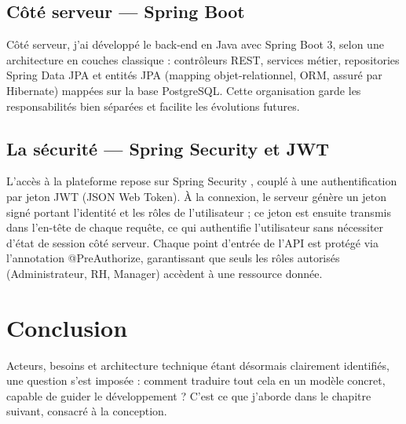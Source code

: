 \subsection{Côté serveur — Spring Boot}
\label{sec_2_3_3}
Côté serveur, j’ai développé le back-end en Java avec Spring Boot 3, selon une architecture en couches classique : contrôleurs REST, services métier, repositories Spring Data JPA et entités JPA (mapping objet-relationnel, ORM, assuré par Hibernate) mappées sur la base PostgreSQL. Cette organisation garde les responsabilités bien séparées et facilite les évolutions futures.

\subsection{La sécurité — Spring Security et JWT}
\label{sec_2_3_4}
L’accès à la plateforme repose sur Spring Security \cite{ref13}, couplé à une authentification par jeton JWT (JSON Web Token). À la connexion, le serveur génère un jeton signé portant l’identité et les rôles de l’utilisateur ; ce jeton est ensuite transmis dans l’en-tête de chaque requête, ce qui authentifie l’utilisateur sans nécessiter d’état de session côté serveur. Chaque point d’entrée de l’API est protégé via l’annotation @PreAuthorize, garantissant que seuls les rôles autorisés (Administrateur, RH, Manager) accèdent à une ressource donnée.

\section{Conclusion}
\label{sec_2_4}
Acteurs, besoins et architecture technique étant désormais clairement identifiés, une question s’est imposée : comment traduire tout cela en un modèle concret, capable de guider le développement ? C’est ce que j’aborde dans le chapitre suivant, consacré à la conception.
